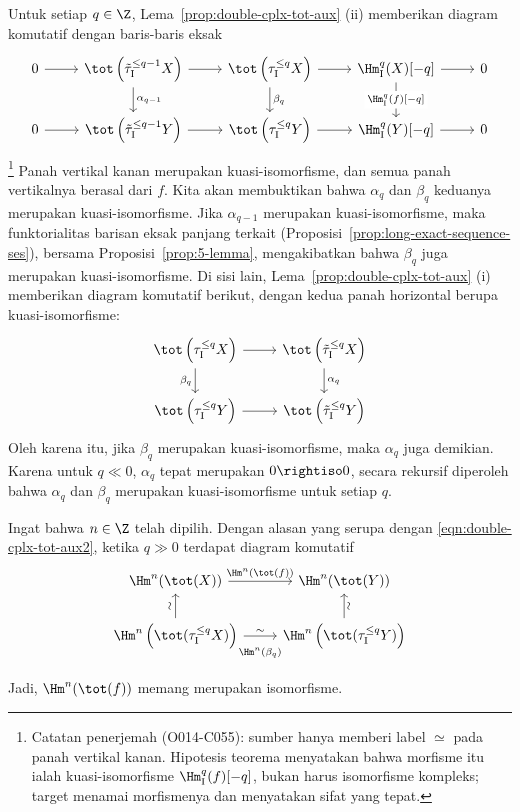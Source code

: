 \begin{bukti}
	Untuk setiap $q \in \Z$, Lema~\ref{prop:double-cplx-tot-aux} (ii)
	memberikan diagram komutatif dengan baris-baris eksak
	\[\begin{tikzcd}
		0 \arrow[r] & \tot\left( \tilde{\tau}_{\mathrm{I}}^{\leq q-1} X \right) \arrow[r] \arrow[d, "{\alpha_{q-1}}"] & \tot\left( \tau_{\mathrm{I}}^{\leq q} X \right) \arrow[d, "{\beta_q}"] \arrow[r] & \Hm_{\mathrm{I}}^q(X)[-q] \arrow[d, "{\Hm_{\mathrm{I}}^q(f)[-q]}" description] \arrow[r] & 0 \\
		0 \arrow[r] & \tot\left( \tilde{\tau}_{\mathrm{I}}^{\leq q-1} Y \right) \arrow[r] & \tot\left( \tau_{\mathrm{I}}^{\leq q} Y \right) \arrow[r] & \Hm_{\mathrm{I}}^q(Y)[-q] \arrow[r] & 0
	\end{tikzcd}\]%
	\footnote{Catatan penerjemah (O014-C055): sumber hanya memberi label
	$\simeq$ pada panah vertikal kanan. Hipotesis teorema menyatakan bahwa
	morfisme itu ialah kuasi-isomorfisme $\Hm_{\mathrm{I}}^q(f)[-q]$, bukan
	harus isomorfisme kompleks; target menamai morfismenya dan menyatakan sifat
	yang tepat.}
	Panah vertikal kanan merupakan kuasi-isomorfisme, dan semua panah
	vertikalnya berasal dari $f$. Kita akan membuktikan bahwa
	$\alpha_q$ dan $\beta_q$ keduanya merupakan kuasi-isomorfisme. Jika
	$\alpha_{q-1}$ merupakan kuasi-isomorfisme, maka funktorialitas barisan
	eksak panjang terkait (Proposisi~\ref{prop:long-exact-sequence-ses}),
	bersama Proposisi~\ref{prop:5-lemma}, mengakibatkan bahwa $\beta_q$ juga
	merupakan kuasi-isomorfisme. Di sisi lain,
	Lema~\ref{prop:double-cplx-tot-aux} (i) memberikan diagram komutatif
	berikut, dengan kedua panah horizontal berupa kuasi-isomorfisme:
	\[\begin{tikzcd}
		\tot\left( \tau_{\mathrm{I}}^{\leq q} X \right) \arrow[r] \arrow[d, "{\beta_q}"'] & \tot\left( \tilde{\tau}_{\mathrm{I}}^{\leq q} X \right) \arrow[d, "{\alpha_q}"] \\
		\tot\left( \tau_{\mathrm{I}}^{\leq q} Y \right) \arrow[r] & \tot\left( \tilde{\tau}_{\mathrm{I}}^{\leq q} Y \right)
	\end{tikzcd}\]
	Oleh karena itu, jika $\beta_q$ merupakan kuasi-isomorfisme, maka
	$\alpha_q$ juga demikian. Karena untuk $q \ll 0$, $\alpha_q$ tepat
	merupakan $0 \rightiso 0$, secara rekursif diperoleh bahwa $\alpha_q$ dan
	$\beta_q$ merupakan kuasi-isomorfisme untuk setiap $q$.
	
	Ingat bahwa $n \in \Z$ telah dipilih. Dengan alasan yang serupa dengan
	\eqref{eqn:double-cplx-tot-aux2}, ketika $q \gg 0$ terdapat diagram
	komutatif
	\[\begin{tikzcd}
		\Hm^n(\tot(X)) \arrow[r, "{\Hm^n(\tot(f))}"] & \Hm^n(\tot(Y)) \\
		\Hm^n\left( \tot(\tau_{\mathrm{I}}^{\leq q} X) \right) \arrow[r, "{\Hm^n(\beta_q)}"' inner sep=0.8em, "\sim"] \arrow[u, "\sim" sloped] & \Hm^n\left( \tot(\tau_{\mathrm{I}}^{\leq q} Y) \right) \arrow[u, "\sim"' sloped]
	\end{tikzcd}\]
	Jadi, $\Hm^n(\tot(f))$ memang merupakan isomorfisme.
	

\end{bukti}
